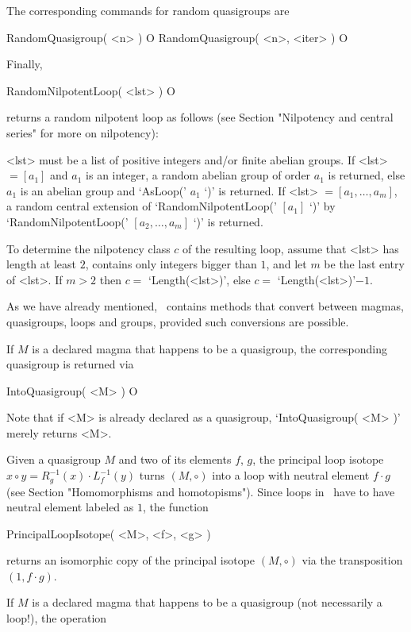 The corresponding commands for random quasigroups
are

\>RandomQuasigroup( <n> ) O
\>RandomQuasigroup( <n>, <iter> ) O

Finally,

\>RandomNilpotentLoop( <lst> ) O

returns a random nilpotent loop as follows (see Section "Nilpotency
and central series" for more on nilpotency):

<lst> must be a list of positive integers and/or finite abelian groups. If
<lst> $= [a_1]$ and $a_1$ is an integer, a random abelian group of order $a_1$
is returned, else $a_1$ is an abelian group and `AsLoop(' $a_1$ `)' is
returned. If <lst> $=[a_1,\dots,a_m]$, a random central extension of
`RandomNilpotentLoop(' $[a_1]$ `)' by `RandomNilpotentLoop(' $[a_2,\dots,a_m]$
`)' is returned.

To determine the nilpotency class $c$ of the resulting loop, assume that <lst>
has length at least $2$, contains only integers bigger than $1$, and let $m$ be
the last entry of <lst>. If $m>2$ then $c=$ `Length(<lst>)', else $c=$
`Length(<lst>)'$-1$.


As we have already mentioned, \LOOPS\ contains methods that convert between
magmas, quasigroups, loops and groups, provided such conversions are possible.

If $M$ is a declared magma that happens to be a quasigroup, the corresponding
quasigroup is returned via

\>IntoQuasigroup( <M> ) O

Note that if <M> is already declared as a quasigroup, `IntoQuasigroup( <M> )'
merely returns <M>.

Given a quasigroup $M$ and two of its elements $f$, $g$, the principal loop
isotope $x\circ y = R_g^{-1}(x)\cdot L_f^{-1}(y)$ turns $(M,\circ)$ into a loop
with neutral element $f\cdot g$ (see Section "Homomorphisms and homotopisms").
Since loops in \LOOPS\ have to have neutral element labeled as $1$, the
function

\>PrincipalLoopIsotope( <M>, <f>, <g> )

returns an isomorphic copy of the principal isotope $(M,\circ)$ via the
transposition $(1,f\cdot g)$.

If $M$ is a declared magma that happens to be a quasigroup (not necessarily a
loop!), the operation

